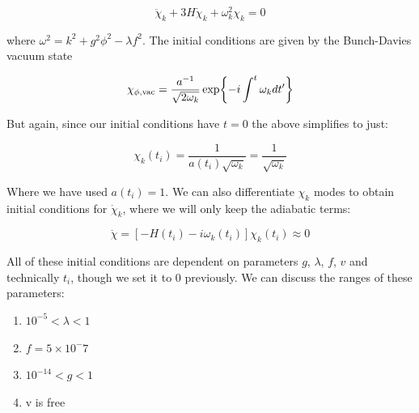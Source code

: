 \begin{equation*}
    \ddot{\chi}_k + 3 H \dot{\chi}_k + \omega^2_k \chi_k = 0
\end{equation*}

where $ \omega^2 = k^2 + g^2 \phi^2 - \lambda f^2 $. The initial conditions are given by the Bunch-Davies vacuum state

\begin{equation*}
    \chi_{\phi, {\rm vac}} = \frac{a^{-1}}{\sqrt{2 \omega_k}} \exp{-i \int^t \omega_k dt^{\prime}}
\end{equation*}

But again, since our initial conditions have $t=0$ the above simplifies to just:

\begin{equation*}
    \chi_k(t_i) = \frac{1}{a(t_i) \sqrt{ \omega_k}} = \frac{1}{\sqrt{ \omega_k }}
\end{equation*}

Where we have used $a(t_i) = 1$. We can also differentiate $\chi_k$ modes to obtain initial conditions for $\dot{\chi}_k$, where we will only keep the adiabatic terms:

\begin{equation*}
    \dot{\chi} = [-H(t_i) - i \omega_k(t_i)] \chi_k(t_i) \approx 0
\end{equation*}

All of these initial conditions are dependent on parameters $g$, $\lambda$, $f$, $v$ and technically $t_i$, though we set it to 0 previously. We can discuss the ranges of these parameters:

\begin{enumerate}
    \item $10^{-5} < \lambda < 1$
    \item $f = 5 \times 10^-7$
    \item $10^{-14} < g < 1$
    \item v is free
\end{enumerate}
